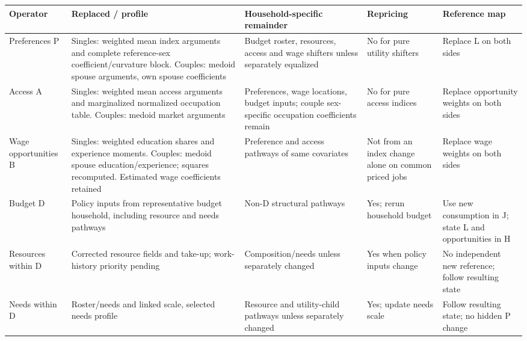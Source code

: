 \documentclass[11pt,a4paper]{article}
\begin{document}
{ %
\small\setlength{\tabcolsep}{3pt}\begin{longtable}[]{@{}
  >{\raggedright\arraybackslash}p{}
  >{\raggedright\arraybackslash}p{}
  >{\raggedright\arraybackslash}p{}
  >{\raggedright\arraybackslash}p{}
  >{\raggedright\arraybackslash}p{}@{}}
\toprule\noalign{}
\begin{minipage}[b]{\linewidth}\raggedright
Operator
\end{minipage} & \begin{minipage}[b]{\linewidth}\raggedright
Replaced / profile
\end{minipage} & \begin{minipage}[b]{\linewidth}\raggedright
Household-specific remainder
\end{minipage} & \begin{minipage}[b]{\linewidth}\raggedright
Repricing
\end{minipage} & \begin{minipage}[b]{\linewidth}\raggedright
Reference map
\end{minipage} \\
\midrule\noalign{}
\endhead
\bottomrule\noalign{}
\endlastfoot
Preferences P & Singles: weighted mean index arguments and complete reference-sex coefficient/curvature block. Couples: medoid spouse arguments, own spouse coefficients & Budget roster, resources, access and wage shifters unless separately equalized & No for pure utility shifters & Replace L on both sides \\
Access A & Singles: weighted mean access arguments and marginalized normalized occupation table. Couples: medoid market arguments & Preferences, wage locations, budget inputs; couple sex-specific occupation coefficients remain & No for pure access indices & Replace opportunity weights on both sides \\
Wage opportunities B & Singles: weighted education shares and experience moments. Couples: medoid spouse education/experience; squares recomputed. Estimated wage coefficients retained & Preference and access pathways of same covariates & Not from an index change alone on common priced jobs & Replace wage weights on both sides \\
Budget D & Policy inputs from representative budget household, including resource and needs pathways & Non-D structural pathways & Yes; rerun household budget & Use new consumption in J; state L and opportunities in H \\
Resources within D & Corrected resource fields and take-up; work-history priority pending & Composition/needs unless separately changed & Yes when policy inputs change & No independent new reference; follow resulting state \\
Needs within D & Roster/needs and linked scale, selected needs profile & Resource and utility-child pathways unless separately changed & Yes; update needs scale & Follow resulting state; no hidden P change \\
\end{longtable}
}
\end{document}
